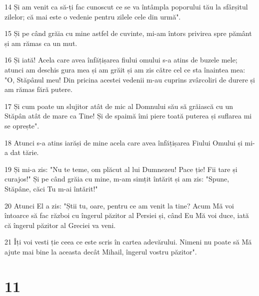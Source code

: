 \par 14 Și am venit ca să-ți fac cunoscut ce se va întâmpla poporului tău la sfârșitul zilelor; că mai este o vedenie pentru zilele cele din urmă".
\par 15 Și pe când grăia cu mine astfel de cuvinte, mi-am întors privirea spre pământ și am rămas ca un mut.
\par 16 Și iată! Acela care avea înfățișarea fiului omului s-a atins de buzele mele; atunci am deschis gura mea și am grăit și am zis către cel ce sta înaintea mea: "O, Stăpânul meu! Din pricina acestei vedenii m-au cuprins zvârcoliri de durere și am rămas fără putere.
\par 17 Și cum poate un slujitor atât de mic al Domnului său să grăiască cu un Stăpân atât de mare ca Tine! Și de spaimă îmi piere toată puterea și suflarea mi se oprește".
\par 18 Atunci s-a atins iarăși de mine acela care avea înfățișarea Fiului Omului și mi-a dat tărie.
\par 19 Și mi-a zis: "Nu te teme, om plăcut al lui Dumnezeu! Pace ție! Fii tare și curajos!" Și pe când grăia cu mine, m-am simțit întărit și am zis: "Spune, Stăpâne, căci Tu m-ai întărit!"
\par 20 Atunci El a zis: "Știi tu, oare, pentru ce am venit la tine? Acum Mă voi întoarce să fac război cu îngerul păzitor al Persiei și, când Eu Mă voi duce, iată că îngerul păzitor al Greciei va veni.
\par 21 Îți voi vesti ție ceea ce este scris în cartea adevărului. Nimeni nu poate să Mă ajute mai bine la aceasta decât Mihail, îngerul vostru păzitor".

\chapter{11}

